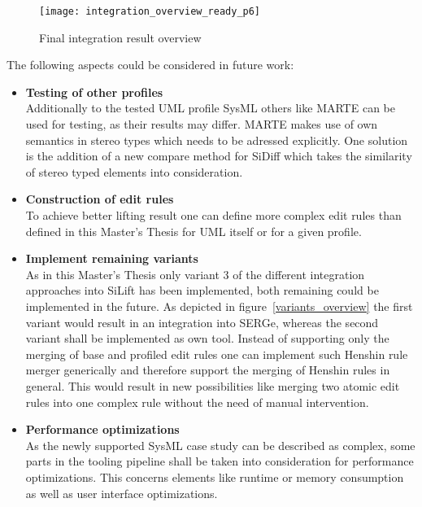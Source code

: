  \begin{figure}[h!]
\begin{center}
\texttt{[image: integration\_overview\_ready\_p6]}\\
\end{center}
\caption{Final integration result overview}
\label{intergration_result_overview}
\end{figure}
\newpage
The following aspects could be considered in future work:
\begin{itemize}
  \item \textbf{Testing of other profiles}\\
  		Additionally to the tested \ac{UML} profile \ac{SysML} others like
  		\ac{MARTE} can be used for testing, as their results may differ.
  		\ac{MARTE} makes use of own semantics in stereo types which needs to be adressed explicitly. One solution is the addition of
  		a new compare method for SiDiff which takes the similarity of stereo typed
  		elements into consideration.
  \item \textbf{Construction of edit rules}\\
 		To achieve better lifting result one can define more complex edit rules
 		than defined in this Master's Thesis for \ac{UML} itself or for a given
 		profile.
  \item \textbf{Implement remaining variants}\\
  		As in this Master's Thesis only variant 3 of the different integration
  		approaches into SiLift has been implemented, both remaining could be
  		implemented in the future. As depicted in figure~\ref{variants_overview} the
  		first variant would result in an integration into \ac{SERGe}, whereas the
  		second variant shall be implemented as own tool. Instead of supporting only
  		the merging of base and profiled edit rules one can implement such Henshin
  		rule merger generically and therefore support the merging of Henshin rules
  		in general. This would result in new possibilities like merging two atomic
  		edit rules into one complex rule without the need of manual intervention.
  \item \textbf{Performance optimizations}\\
  		As the newly supported \ac{SysML} case study can be described as complex,
  		some parts in the tooling pipeline shall be taken into consideration for
  		performance optimizations. This concerns elements like runtime or memory
  		consumption as well as user interface optimizations.
\end{itemize}